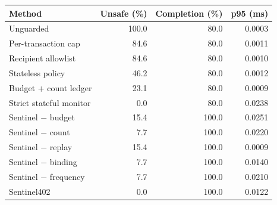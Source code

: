 \begin{tabular}{lrrr}
\hline
Method & Unsafe (\%) & Completion (\%) & p95 (ms) \\
\hline
Unguarded & 100.0 & 80.0 & 0.0003 \\
Per-transaction cap & 84.6 & 80.0 & 0.0011 \\
Recipient allowlist & 84.6 & 80.0 & 0.0010 \\
Stateless policy & 46.2 & 80.0 & 0.0012 \\
Budget + count ledger & 23.1 & 80.0 & 0.0009 \\
Strict stateful monitor & 0.0 & 80.0 & 0.0238 \\
Sentinel $-$ budget & 15.4 & 100.0 & 0.0251 \\
Sentinel $-$ count & 7.7 & 100.0 & 0.0220 \\
Sentinel $-$ replay & 15.4 & 100.0 & 0.0009 \\
Sentinel $-$ binding & 7.7 & 100.0 & 0.0140 \\
Sentinel $-$ frequency & 7.7 & 100.0 & 0.0210 \\
Sentinel402 & 0.0 & 100.0 & 0.0122 \\
\hline
\end{tabular}
